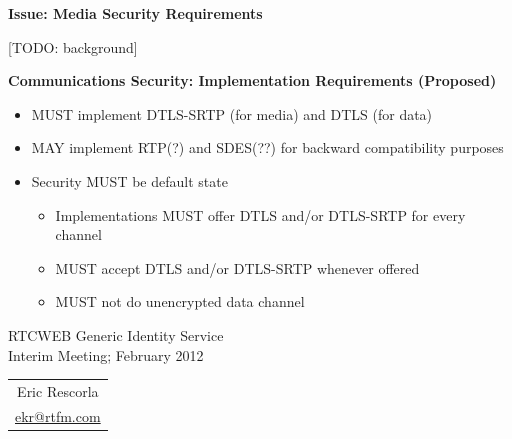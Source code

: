 \documentclass[helvetica]{seminar}
\newcommand{\heading}[1]{%
  \begin{center} 
    \large\bf 
    #1 
  \end{center} 
  \vspace{.4 in}}
\begin{document}
\begin{slide}
\heading{Issue: Media Security Requirements}

[TODO: background]

\end{slide}


\begin{slide}
\heading{Communications Security: Implementation Requirements (Proposed)}

\begin{itemize}
\item MUST implement DTLS-SRTP (for media) and DTLS (for data) 
\item MAY implement RTP(?) and SDES(??) for backward compatibility purposes 
\item Security MUST be default state
  \begin{itemize}
  \item Implementations MUST offer DTLS and/or DTLS-SRTP for every channel
  \item MUST accept DTLS and/or DTLS-SRTP whenever offered 
  \item MUST not do unencrypted data channel
  \end{itemize}
\end{itemize}

\end{slide}



\centerslidestrue

\begin{slide}
\begin{center}
\vspace{1 in}
\LARGE{{\bf}RTCWEB Generic Identity Service}\\
\vspace{.2in}
\large{{Interim Meeting; February 2012}} \\
\vspace{3em}
\large{
\begin{tabular}{c}
Eric Rescorla \\
\url{ekr@rtfm.com}
\end{tabular}
}
\end{center}

\end{slide}


\centerslidesfalse
\end{document}
